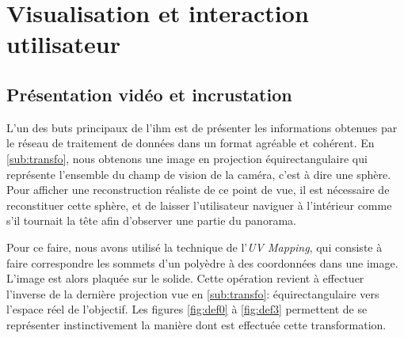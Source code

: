	\section{Visualisation et interaction utilisateur}
				
		\subsection{Présentation vidéo et incrustation}
			
			L'un des buts principaux de l'\gls{ihm} est de présenter les informations obtenues par le réseau de traitement de données dans un format agréable et cohérent. En \autoref{sub:transfo}, nous obtenons une image en projection équirectangulaire qui représente l'ensemble du champ de vision de la caméra, c'est à dire une sphère. Pour afficher une reconstruction réaliste de ce point de vue, il est nécessaire de reconstituer cette sphère, et de laisser l'utilisateur naviguer à l'intérieur comme s'il tournait la tête afin d'observer une partie du panorama.
			\par
			Pour ce faire, nous avons utilisé la technique de l'\emph{UV Mapping}, qui consiste à faire correspondre les sommets d'un polyèdre à des coordonnées dans une image. L'image est alors \og plaquée \fg{} sur le solide. Cette opération revient à effectuer l'inverse de la dernière projection vue en \autoref{sub:transfo}: équirectangulaire vers l'espace réel de l'objectif. Les figures \ref{fig:def0} à \ref{fig:def3} permettent de se représenter instinctivement la manière dont est effectuée cette transformation.
			
